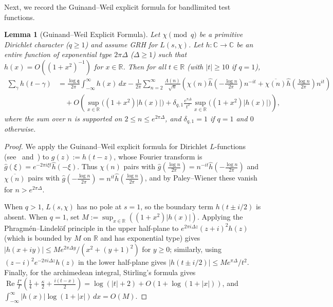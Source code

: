 \documentclass[11pt,a4paper]{amsart}
\newtheorem{lemma}[theorem]{Lemma}
\theoremstyle{remark}
\numberwithin{equation}{section}
\newcommand{\R}{\mathbb{R}}
\newcommand{\C}{\mathbb{C}}
\newcommand{\q}{\mathfrak{q}}
\begin{document}
Next, we record the Guinand--Weil explicit formula for bandlimited test functions.

\begin{lemma}[Guinand--Weil Explicit Formula]\label{lem:guinand_weil}
Let $\chi \pmod q$ be a primitive Dirichlet character ($q \ge 1$) and assume GRH for $L(s,\chi)$. Let $h : \C \to \C$ be an entire function of exponential type $2\pi\Delta$ ($\Delta \ge 1$) such that $h(x) = O((1+x^2)^{-1})$ for $x \in \R$. Then for all $t \in \R$ (with $|t| \ge 10$ if $q = 1$),
\begin{align*}
  \sum_\gamma h(t-\gamma) &= \frac{\log\q}{2\pi}\int_{-\infty}^\infty h(x)\,dx
  - \frac{1}{2\pi}\sum_{n=2}^\infty \frac{\Lambda(n)}{\sqrt{n}}\left(\chi(n)\widehat{h}\!\left(-\frac{\log n}{2\pi}\right)n^{-it} + \overline{\chi(n)}\widehat{h}\!\left(\frac{\log n}{2\pi}\right)n^{it}\right) \\
  &\quad + O\!\left(\sup_{x \in \R}\bigl((1+x^2)|h(x)|\bigr) + \delta_{q,1}\frac{e^{\pi\Delta}}{t^2}\sup_{x \in \R}\bigl((1+x^2)|h(x)|\bigr)\right),
\end{align*}
where the sum over $n$ is supported on $2 \le n \le e^{2\pi\Delta}$, and $\delta_{q,1} = 1$ if $q=1$ and $0$ otherwise.
\end{lemma}

\begin{proof}
We apply the Guinand--Weil explicit formula for Dirichlet $L$-functions (see~\cite[Lemma~5]{CCM2013} and~\cite{CCM2015}) to $g(z) := h(t-z)$, whose Fourier transform is $\widehat{g}(\xi) = e^{-2\pi i\xi t}\widehat{h}(-\xi)$. Thus $\chi(n)$ pairs with $\widehat{g}(\frac{\log n}{2\pi}) = n^{-it}\widehat{h}(-\frac{\log n}{2\pi})$ and $\overline{\chi(n)}$ pairs with $\widehat{g}(-\frac{\log n}{2\pi}) = n^{it}\widehat{h}(\frac{\log n}{2\pi})$, and by Paley--Wiener these vanish for $n > e^{2\pi\Delta}$.

When $q > 1$, $L(s,\chi)$ has no pole at $s = 1$, so the boundary term $h(t \pm i/2)$ is absent. When $q = 1$, set $M := \sup_{x\in\R}((1+x^2)|h(x)|)$. Applying the Phragm\'en--Lindel\"of principle in the upper half-plane to $e^{2\pi i\Delta z}(z+i)^2 h(z)$ (which is bounded by $M$ on $\R$ and has exponential type) gives $|h(x+iy)| \le M e^{2\pi\Delta y}/(x^2+(y+1)^2)$ for $y \ge 0$; similarly, using $(z-i)^2 e^{-2\pi i\Delta z}h(z)$ in the lower half-plane gives $|h(t \pm i/2)| \le M e^{\pi\Delta}/t^2$. Finally, for the archimedean integral, Stirling's formula gives $\operatorname{Re}\frac{\Gamma'}{\Gamma}(\frac{1}{4}+\frac{\kappa}{2}+\frac{i(t-x)}{2}) = \log(|t|+2) + O(1 + \log(1+|x|))$, and $\int_{-\infty}^\infty |h(x)|\log(1+|x|)\,dx = O(M)$.
\end{proof}
\end{document}
